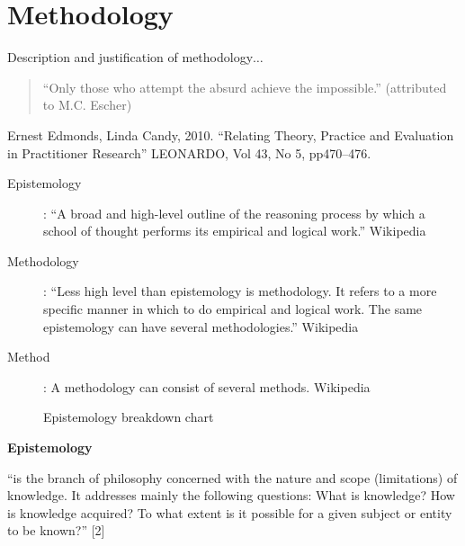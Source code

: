 
\chapter{Methodology}
\label{ch:method}

\begin{shaded}
  Description and justification of methodology$\ldots$
\end{shaded}

\begin{quote}
  ``Only those who attempt the absurd achieve the impossible.'' (attributed to M.C. Escher)
\end{quote}

Ernest Edmonds, Linda Candy, 2010. ``Relating Theory, Practice and Evaluation in Practitioner Research'' LEONARDO, Vol 43, No 5, pp470--476.

\begin{description}
  \item [Epistemology]:	``A broad and high-level outline of the reasoning process by which a school of thought performs its empirical and logical work.'' Wikipedia
  \item [Methodology]: ``Less high level than epistemology is methodology. It refers to a more specific manner in which to do empirical and logical work. The same epistemology can have several methodologies.'' Wikipedia
  \item [Method]:	A methodology can consist of several methods. Wikipedia
\end{description}

\begin{figure}[htb]
  \centering
  \caption[Epistemology]{Epistemology breakdown chart}
\label{fig:method}
\end{figure}

\textbf{Epistemology}

``is the branch of philosophy concerned with the nature and scope (limitations) of knowledge. It addresses mainly the following questions: What is knowledge? How is knowledge acquired? To what extent is it possible for a given subject or entity to be known?'' [2]

